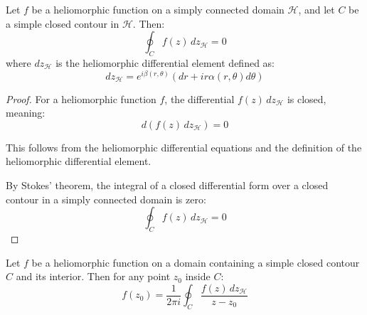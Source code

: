 \begin{theorem}
Let $f$ be a heliomorphic function on a simply connected domain $\mathcal{H}$, and let $C$ be a simple closed contour in $\mathcal{H}$. Then:
\begin{equation}
\oint_C f(z) \, dz_{\mathcal{H}} = 0
\end{equation}
where $dz_{\mathcal{H}}$ is the heliomorphic differential element defined as:
\begin{equation}
dz_{\mathcal{H}} = e^{i\beta(r,\theta)}(dr + ir\alpha(r,\theta)d\theta)
\end{equation}
\end{theorem}

\begin{proof}
For a heliomorphic function $f$, the differential $f(z) \, dz_{\mathcal{H}}$ is closed, meaning:
\begin{equation}
d(f(z) \, dz_{\mathcal{H}}) = 0
\end{equation}

This follows from the heliomorphic differential equations and the definition of the heliomorphic differential element.

By Stokes' theorem, the integral of a closed differential form over a closed contour in a simply connected domain is zero:
\begin{equation}
\oint_C f(z) \, dz_{\mathcal{H}} = 0
\end{equation}
\end{proof}

\begin{theorem}
Let $f$ be a heliomorphic function on a domain containing a simple closed contour $C$ and its interior. Then for any point $z_0$ inside $C$:
\begin{equation}
f(z_0) = \frac{1}{2\pi i} \oint_C \frac{f(z) \, dz_{\mathcal{H}}}{z - z_0}
\end{equation}
\end{theorem}

